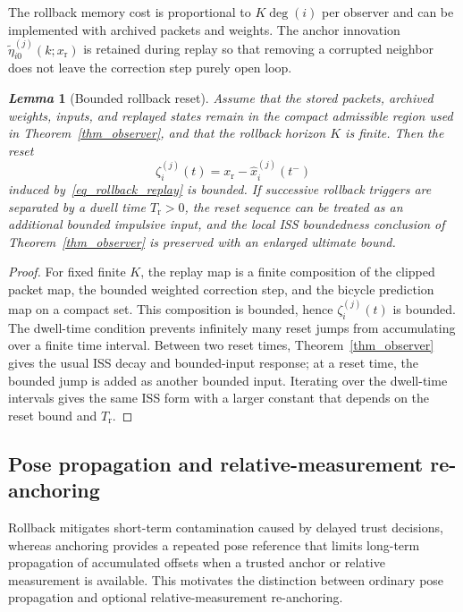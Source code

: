 \documentclass[letterpaper,journal]{IEEEtran}
\newtheorem{lemma}{\it Lemma}%
\begin{document}
The rollback memory cost is proportional to $K\deg(i)$ per observer and can be implemented with archived packets and weights. The anchor innovation $\tilde{\eta}_{i0}^{(j)}(k;x_{\mathrm{r}})$ is retained during replay so that removing a corrupted neighbor does not leave the correction step purely open loop.

\begin{lemma}[Bounded rollback reset]\label{lem_rollback_bounded}
Assume that the stored packets, archived weights, inputs, and replayed states remain in the compact admissible region used in Theorem~\ref{thm_observer}, and that the rollback horizon $K$ is finite. Then the reset
\[
    \zeta_i^{(j)}(t)=x_{\mathrm r}-\hat{x}_i^{(j)}(t^-)
\]
induced by~\eqref{eq_rollback_replay} is bounded. If successive rollback triggers are separated by a dwell time $T_{\mathrm r}>0$, the reset sequence can be treated as an additional bounded impulsive input, and the local ISS boundedness conclusion of Theorem~\ref{thm_observer} is preserved with an enlarged ultimate bound.
\end{lemma}
\begin{proof}
For fixed finite $K$, the replay map is a finite composition of the clipped packet map, the bounded weighted correction step, and the bicycle prediction map on a compact set. This composition is bounded, hence $\zeta_i^{(j)}(t)$ is bounded. The dwell-time condition prevents infinitely many reset jumps from accumulating over a finite time interval. Between two reset times, Theorem~\ref{thm_observer} gives the usual ISS decay and bounded-input response; at a reset time, the bounded jump is added as another bounded input. Iterating over the dwell-time intervals gives the same ISS form with a larger constant that depends on the reset bound and $T_{\mathrm r}$.
\end{proof}

\subsection{Pose propagation and relative-measurement re-anchoring}
Rollback mitigates short-term contamination caused by delayed trust decisions, whereas anchoring provides a repeated pose reference that limits long-term propagation of accumulated offsets when a trusted anchor or relative measurement is available. This motivates the distinction between ordinary pose propagation and optional relative-measurement re-anchoring.
\end{document}
